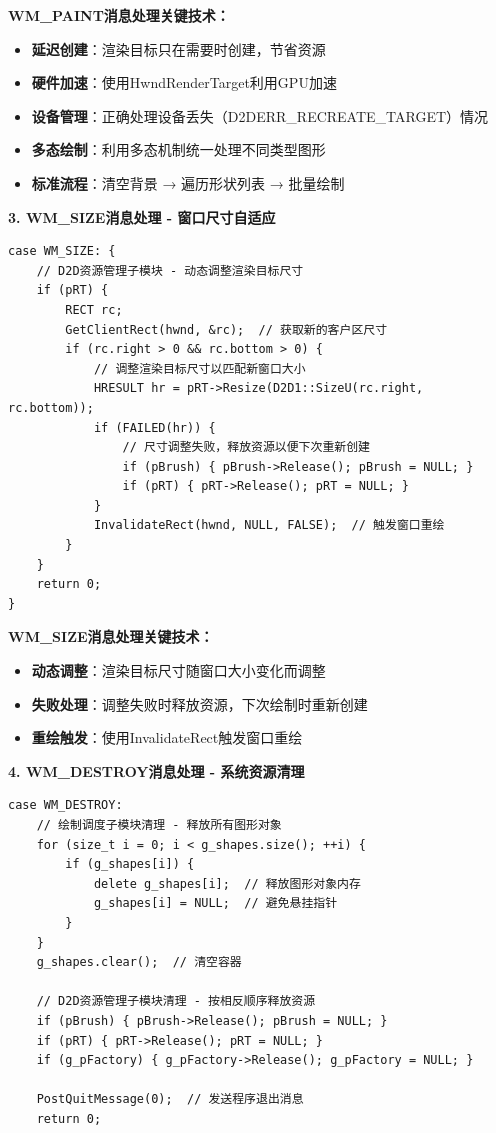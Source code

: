 \documentclass[12pt,a4paper]{article}
\begin{document}
\textbf{WM\_PAINT消息处理关键技术：}
\begin{itemize}
    \item \textbf{延迟创建}：渲染目标只在需要时创建，节省资源
    \item \textbf{硬件加速}：使用HwndRenderTarget利用GPU加速
    \item \textbf{设备管理}：正确处理设备丢失（D2DERR\_RECREATE\_TARGET）情况
    \item \textbf{多态绘制}：利用多态机制统一处理不同类型图形
    \item \textbf{标准流程}：清空背景 → 遍历形状列表 → 批量绘制
\end{itemize}

\textbf{3. WM\_SIZE消息处理 - 窗口尺寸自适应}

\begin{lstlisting}[caption=窗口尺寸变化处理]
case WM_SIZE: {
    // D2D资源管理子模块 - 动态调整渲染目标尺寸
    if (pRT) {
        RECT rc;
        GetClientRect(hwnd, &rc);  // 获取新的客户区尺寸
        if (rc.right > 0 && rc.bottom > 0) {
            // 调整渲染目标尺寸以匹配新窗口大小
            HRESULT hr = pRT->Resize(D2D1::SizeU(rc.right, rc.bottom));
            if (FAILED(hr)) {
                // 尺寸调整失败，释放资源以便下次重新创建
                if (pBrush) { pBrush->Release(); pBrush = NULL; }
                if (pRT) { pRT->Release(); pRT = NULL; }
            }
            InvalidateRect(hwnd, NULL, FALSE);  // 触发窗口重绘
        }
    }
    return 0;
}
\end{lstlisting}

\textbf{WM\_SIZE消息处理关键技术：}
\begin{itemize}
    \item \textbf{动态调整}：渲染目标尺寸随窗口大小变化而调整
    \item \textbf{失败处理}：调整失败时释放资源，下次绘制时重新创建
    \item \textbf{重绘触发}：使用InvalidateRect触发窗口重绘
\end{itemize}

\textbf{4. WM\_DESTROY消息处理 - 系统资源清理}

\begin{lstlisting}[caption=系统资源清理处理]
case WM_DESTROY:
    // 绘制调度子模块清理 - 释放所有图形对象
    for (size_t i = 0; i < g_shapes.size(); ++i) {
        if (g_shapes[i]) {
            delete g_shapes[i];  // 释放图形对象内存
            g_shapes[i] = NULL;  // 避免悬挂指针
        }
    }
    g_shapes.clear();  // 清空容器
    
    // D2D资源管理子模块清理 - 按相反顺序释放资源
    if (pBrush) { pBrush->Release(); pBrush = NULL; }
    if (pRT) { pRT->Release(); pRT = NULL; }
    if (g_pFactory) { g_pFactory->Release(); g_pFactory = NULL; }
    
    PostQuitMessage(0);  // 发送程序退出消息
    return 0;
\end{lstlisting}
\end{document}
